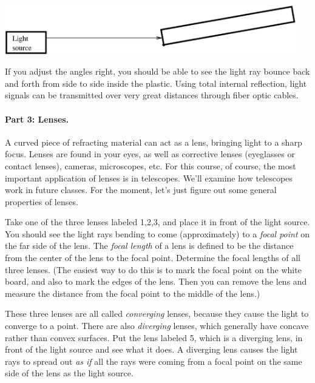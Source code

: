 \centerline{\includegraphics[width=5in]{lenses1/lensfig4.eps}}



If you adjust the angles right, you should be able to see the light ray
bounce back and forth from side to side inside the plastic.  
Using total internal reflection, 
light signals can be transmitted over very great distances through
fiber optic cables.

\paragraph{Part 3: Lenses.}
A curved piece of refracting material can act as a lens, bringing
light to a sharp focus.  Lenses are found in your eyes, as well as
corrective lenses (eyeglasses or contact lenses), cameras,
microscopes, etc.  For this course, of course, the most important
application of lenses is in telescopes.  We'll examine how telescopes
work in future classes.  For the moment, let's just figure
out some general properties of lenses.

Take one of the three lenses labeled 1,2,3, and place it in front
of the light source.  You should see the light rays bending to
come (approximately) to a {\it focal point} on the far side of the lens.  
The {\it focal length} of a lens is defined to be the distance from the center
of the lens to the focal point.  Determine the focal lengths of all
three lenses.  (The easiest way to do this is to mark the focal point
on the white board, and also to mark the edges of the lens.  Then
you can remove the lens and measure the distance from the focal
point to the middle of the lens.)

\answerspace{2.5in}

These three lenses are all called {\it converging} lenses, because
they cause the light to converge to a point.  There are also {\it diverging}
lenses, which generally have concave rather than convex surfaces.  Put
the lens labeled 5, which is a diverging lens, 
in front of the light source and see what it does.
A diverging lens causes the light rays to spread out {\it as if} all the
rays were coming from a focal point on the same side of the lens
as the light source.

